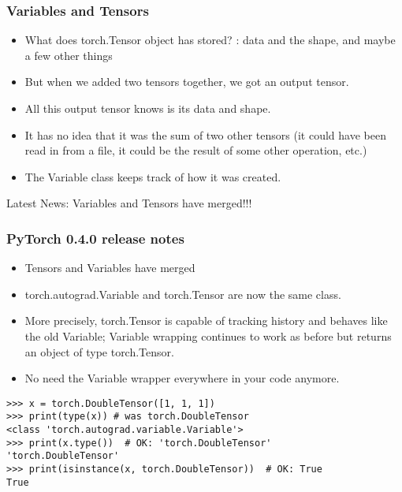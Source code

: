  
\begin{frame}[fragile]
\frametitle{Variables and Tensors}
\begin{itemize}
\item What does torch.Tensor object has stored? : data and the shape, and maybe a few other things
\item But when we added two tensors together, we got an output tensor. 
\item All this output tensor knows is its data and shape. 
\item It has no idea that it was the sum of two other tensors (it could have been read in from a file, it could be the result of some other operation, etc.)
\item The Variable class keeps track of how it was created. 
\end{itemize}
Latest News: Variables and Tensors have merged!!!
 \end{frame} 
 
 
\begin{frame}[fragile]
\frametitle{PyTorch 0.4.0 release notes}
\begin{itemize}
\item Tensors and Variables have merged
\item torch.autograd.Variable and torch.Tensor are now the same class. 
\item More precisely, torch.Tensor is capable of tracking history and behaves like the old Variable; Variable wrapping continues to work as before but returns an object of type torch.Tensor. \item No need the Variable wrapper everywhere in your code anymore.
\end{itemize}
 \begin{lstlisting}
>>> x = torch.DoubleTensor([1, 1, 1])
>>> print(type(x)) # was torch.DoubleTensor
<class 'torch.autograd.variable.Variable'>
>>> print(x.type())  # OK: 'torch.DoubleTensor'
'torch.DoubleTensor'
>>> print(isinstance(x, torch.DoubleTensor))  # OK: True
True
 \end{lstlisting}
 \end{frame} 
 
